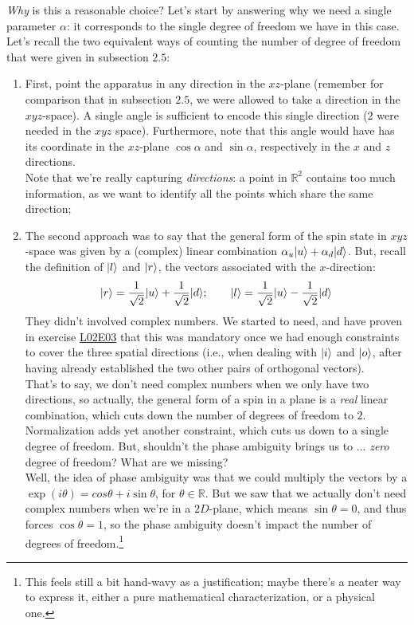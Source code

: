 \documentclass[solutions.tex]{subfiles}
\begin{document}
\textit{Why} is this a reasonable choice? Let's start by answering
why we need a single parameter $\alpha$: it corresponds to the single
degree of freedom we have in this case. Let's recall the two equivalent
ways of counting the number of degree of freedom that were given
in subsection $2.5$:

\begin{enumerate}
	\item First, point the apparatus in any direction in the $xz$-plane
	(remember for comparison that in subsection $2.5$, we were allowed
	to take a direction in the $xyz$-space). A single angle is sufficient
	to encode this single direction ($2$ were needed in the $xyz$ space).
	Furthermore, note that this angle would have has its coordinate in
	the $xz$-plane $\cos\alpha$ and $\sin\alpha$, respectively in the
	$x$ and $z$ directions. \\

	Note that we're really capturing \textit{directions}: a point
	in $\mathbb{R}^2$ contains too much information, as we want
	to identify all the points which share the same direction;
	\item The second approach was to say that the general form of the
	spin state in $xyz$-space was given by a (complex) linear combination
	$\alpha_u|u\rangle+\alpha_d|d\rangle$. But, recall the definition
	of $|l\rangle$ and $|r\rangle$, the vectors associated with the $x$-direction:
	\[
		|r\rangle = \frac1{\sqrt2}|u\rangle + \frac1{\sqrt2}|d\rangle;\qquad
		|l\rangle = \frac1{\sqrt2}|u\rangle - \frac1{\sqrt2}|d\rangle
	\]
	They didn't involved complex numbers. We started to need, and have
	proven in exercise
	\href{https://github.com/mbivert/ttm/blob/master/qm/L02E03.pdf}{L02E03}
	that this was mandatory once we had
	enough constraints to cover the three spatial directions (i.e.,
	when dealing with $|i\rangle$ and $|o\rangle$, after having already
	established the two other pairs of orthogonal vectors). \\

	That's to say, we don't need complex numbers when we only have
	two directions, so actually, the general form of a spin
	in a plane is a \textit{real} linear combination, which cuts
	down the number of degrees of freedom to $2$. \\

	Normalization adds yet another constraint, which cuts us down
	to a single degree of freedom. But, shouldn't the phase
	ambiguity brings us to $\ldots$ \textit{zero} degree of freedom?
	What are we missing? \\

	Well, the idea of phase ambiguity was that we could multiply
	the vectors by a $\exp(i\theta) = cos\theta+i\sin\theta$, for
	$\theta\in\mathbb{R}$. But we saw that we actually don't need
	complex numbers when we're in a $2D$-plane, which means
	$\sin\theta = 0$, and thus forces $\cos\theta = 1$, so the
	phase ambiguity doesn't impact the number of degrees
	of freedom.\footnote{This feels still a bit hand-wavy
	as a justification; maybe there's a neater way to express
	it, either a pure mathematical characterization, or a physical
	one.} %
\end{enumerate}
\end{document}
